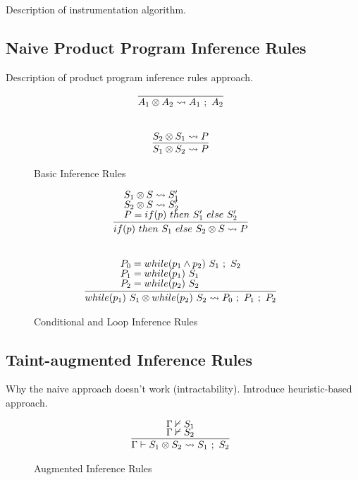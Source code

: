 \documentclass[letterpaper,twocolumn,10pt]{article}
\newcommand{\cross}{\otimes{}}
\begin{document}
Description of instrumentation algorithm.

\subsection{Naive Product Program Inference Rules}

Description of product program inference rules approach.

\begin{figure}
    \label{fig:infrules1}
    \caption{Basic Inference Rules}
    \[
		\begin{array}{c}
			\infer[]{A_1 \cross A_2 \leadsto A_1\ ;\ A_2}{} \\ \\ \\
			\infer[]{S_1 \cross S_2 \leadsto P}{
				S_2 \cross S_1 \leadsto P
			}
        \end{array}
    \]
\end{figure}

\begin{figure}
    \label{fig:infrules2}
    \caption{Conditional and Loop Inference Rules}
    \[
		\begin{array}{c}
			\infer[]{if(p)\ then\ S_1\ else\ S_2 \cross S \leadsto P}{
				\text{$S_1 \cross S \leadsto S_1'$} \\
				\text{$S_2 \cross S \leadsto S_2'$} \\
				\text{$P = if(p)\ then\ S_1'\ else\ S_2'$}
			} \\ \\ \\
			\infer[]{while(p_1)\ S_1 \cross while(p_2)\ S_2 \leadsto P_0\ ;\ P_1\ ;\ P_2}{
				\text{$P_0 = while(p_1 \land p_2)\ S_1\ ;\ S_2$} \\
				\text{$P_1 = while(p_1)\ S_1$} \\
				\text{$P_2 = while(p_2)\ S_2$}
			}
        \end{array}
    \]
\end{figure}

\subsection{Taint-augmented Inference Rules}

Why the naive approach doesn't work (intractability). Introduce heuristic-based approach.

\begin{figure}
    \label{fig:auginfrules1}
    \caption{Augmented Inference Rules}
    \[
		\begin{array}{c}
			\infer[]{\Gamma \vdash S_1 \cross S_2 \leadsto S_1\ ;\ S_2}{
				\Gamma \nvdash S_1 \\
				\Gamma \nvdash S_2
			} \\
		\end{array}
    \]
\end{figure}
\end{document}
